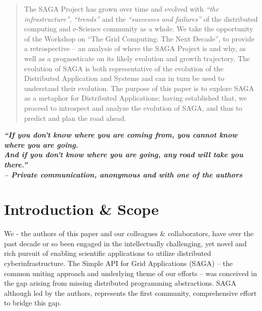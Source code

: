 \documentclass[]{article}
\newcommand{\I}[1]{\textit{#1}}
\begin{document}
\begin{abstract}

  The SAGA Project has grown over time and evolved with \I{``the
    infrastructure''}, \I{``trends''} and the \I{``successes and
    failures''} of the distributed computing and e-Science community
  as a whole.  We take the opportunity of the Workshop on ``The Grid
  Computing: The Next Decade'', to provide a retrospective -- an
  analysis of where the SAGA Project is and why, as well as a
  prognosticate on its likely evolution and growth trajectory.  The
  evolution of SAGA is both representative of the evolution of the
  Distributed Application and Systems and can in turn be used to
  understand their evolution.  The purpose of this paper is to explore
  SAGA as a metaphor for Distributed Applications; having established
  that, we proceed to introspect and analyze the evolution of SAGA,
  and thus to predict and plan the road ahead.
\end{abstract}
\begin{center}

  \footnotesize{\bf{\it ``If you don't know where you are coming from,
      you cannot know where you are going. \\ And if you don't know
      where you are going, any road will take you there.''  \\
      -- Private communication, anonymous and with one of the
      authors}}

\end{center}

\section{Introduction \& Scope }
\label{sec:intro}


We - the authors of this paper and our colleagues \& collaborators,
have over the past decade or so been engaged in the intellectually
challenging, yet novel and rich pursuit of enabling scientific
applications to utilize distributed cyberinfrastructure.  The Simple
API for Grid Applications (SAGA) -- the common uniting approach and
underlying theme of our efforts -- was conceived in the gap arising
from missing distributed programming abstractions. SAGA although led
by the authors, represents the first community, comprehensive effort
to bridge this gap.
\end{document}
